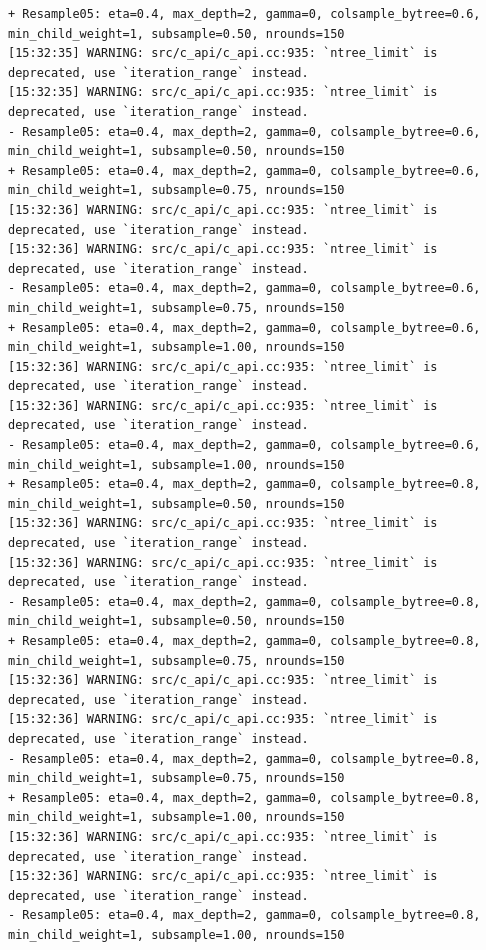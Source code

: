 \documentclass[
  letterpaper,
  DIV=11,
  numbers=noendperiod]{scrartcl}
\begin{document}
\begin{verbatim}
+ Resample05: eta=0.4, max_depth=2, gamma=0, colsample_bytree=0.6, min_child_weight=1, subsample=0.50, nrounds=150 
[15:32:35] WARNING: src/c_api/c_api.cc:935: `ntree_limit` is deprecated, use `iteration_range` instead.
[15:32:35] WARNING: src/c_api/c_api.cc:935: `ntree_limit` is deprecated, use `iteration_range` instead.
- Resample05: eta=0.4, max_depth=2, gamma=0, colsample_bytree=0.6, min_child_weight=1, subsample=0.50, nrounds=150 
+ Resample05: eta=0.4, max_depth=2, gamma=0, colsample_bytree=0.6, min_child_weight=1, subsample=0.75, nrounds=150 
[15:32:36] WARNING: src/c_api/c_api.cc:935: `ntree_limit` is deprecated, use `iteration_range` instead.
[15:32:36] WARNING: src/c_api/c_api.cc:935: `ntree_limit` is deprecated, use `iteration_range` instead.
- Resample05: eta=0.4, max_depth=2, gamma=0, colsample_bytree=0.6, min_child_weight=1, subsample=0.75, nrounds=150 
+ Resample05: eta=0.4, max_depth=2, gamma=0, colsample_bytree=0.6, min_child_weight=1, subsample=1.00, nrounds=150 
[15:32:36] WARNING: src/c_api/c_api.cc:935: `ntree_limit` is deprecated, use `iteration_range` instead.
[15:32:36] WARNING: src/c_api/c_api.cc:935: `ntree_limit` is deprecated, use `iteration_range` instead.
- Resample05: eta=0.4, max_depth=2, gamma=0, colsample_bytree=0.6, min_child_weight=1, subsample=1.00, nrounds=150 
+ Resample05: eta=0.4, max_depth=2, gamma=0, colsample_bytree=0.8, min_child_weight=1, subsample=0.50, nrounds=150 
[15:32:36] WARNING: src/c_api/c_api.cc:935: `ntree_limit` is deprecated, use `iteration_range` instead.
[15:32:36] WARNING: src/c_api/c_api.cc:935: `ntree_limit` is deprecated, use `iteration_range` instead.
- Resample05: eta=0.4, max_depth=2, gamma=0, colsample_bytree=0.8, min_child_weight=1, subsample=0.50, nrounds=150 
+ Resample05: eta=0.4, max_depth=2, gamma=0, colsample_bytree=0.8, min_child_weight=1, subsample=0.75, nrounds=150 
[15:32:36] WARNING: src/c_api/c_api.cc:935: `ntree_limit` is deprecated, use `iteration_range` instead.
[15:32:36] WARNING: src/c_api/c_api.cc:935: `ntree_limit` is deprecated, use `iteration_range` instead.
- Resample05: eta=0.4, max_depth=2, gamma=0, colsample_bytree=0.8, min_child_weight=1, subsample=0.75, nrounds=150 
+ Resample05: eta=0.4, max_depth=2, gamma=0, colsample_bytree=0.8, min_child_weight=1, subsample=1.00, nrounds=150 
[15:32:36] WARNING: src/c_api/c_api.cc:935: `ntree_limit` is deprecated, use `iteration_range` instead.
[15:32:36] WARNING: src/c_api/c_api.cc:935: `ntree_limit` is deprecated, use `iteration_range` instead.
- Resample05: eta=0.4, max_depth=2, gamma=0, colsample_bytree=0.8, min_child_weight=1, subsample=1.00, nrounds=150 

\end{verbatim}
\end{document}
